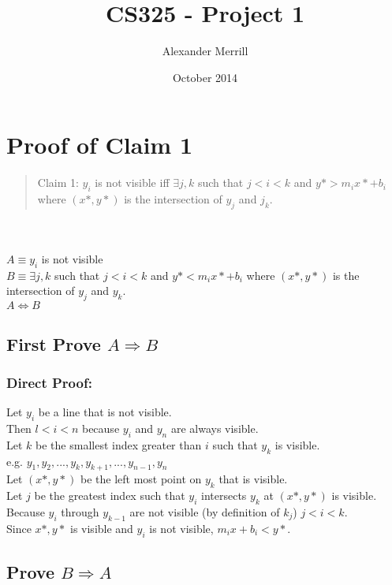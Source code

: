 \documentclass{article}
\title{CS325 - Project 1}
\author{Alexander Merrill}
\date{October 2014}
\begin{document}
\maketitle

\section*{Proof of Claim 1}

\begin{quote}
    Claim 1: $y_i$ is not visible iff $\exists j,k$ such that $j < i < k$ and $y* > m_i x* + b_i$ where $(x*,y*)$ is the intersection of $y_j$ and $j_k$.
\end{quote}\\
\\
$A \equiv y_i$ is not visible\\
$B \equiv \exists j,k$ such that $j < i < k$ and $y* < m_i x* + b_i$ where $(x*,y*)$ is the intersection of $y_j$ and $y_k$.\\
$A \Leftrightarrow B$

\subsection*{First Prove $A \Rightarrow B$}
    \subsubsection*{Direct Proof:}
    Let $y_i$ be a line that is not visible.\\
    Then $l < i < n$ because $y_i$ and $y_n$ are always visible.\\
    Let $k$ be the smallest index greater than $i$ such that $y_k$ is visible.\\
    e.g. $y_1,y_2,...,y_k,y_{k+1},...,y_{n-1},y_n$\\
    Let $(x*,y*)$ be the left most point on $y_k$ that is visible.\\
    Let $j$ be the greatest index such that $y_i$ intersects $y_k$ at $(x*,y*)$ is visible.\\
    Because $y_i$ through $y_{k-1}$ are not visible (by definition of $k_j$) $j < i < k$.\\
    Since $x*,y*$ is visible and $y_i$ is not visible, $m_i x + b_i < y*$.
    
\subsection*{Prove $B \Rightarrow A$}
\end{document}
